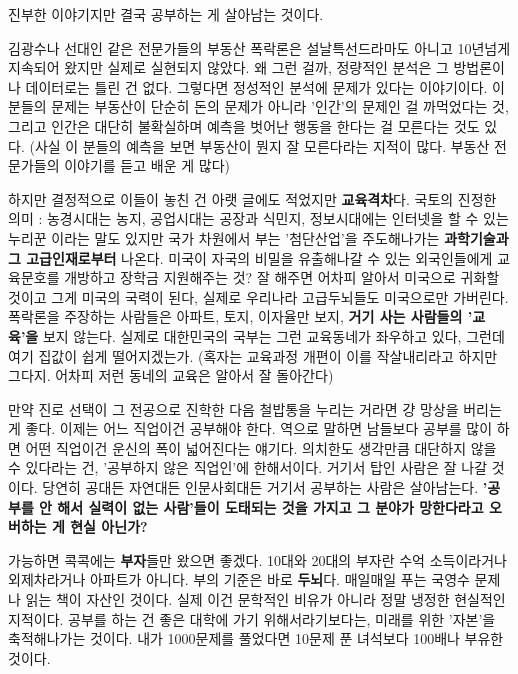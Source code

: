 진부한 이야기지만 결국 공부하는 게 살아남는 것이다.
\vspace{5mm}

김광수나 선대인 같은 전문가들의 부동산 폭락론은 설날특선드라마도 아니고 10년넘게 지속되어 왔지만 실제로 실현되지 않았다.
왜 그런 걸까, 정량적인 분석은 그 방법론이나 데이터로는 틀린 건 없다.
그렇다면 정성적인 분석에 문제가 있다는 이야기이다.
이 분들의 문제는 부동산이 단순히 돈의 문제가 아니라
'인간'의 문제인 걸 까먹었다는 것,
그리고 인간은 대단히 불확실하며 예측을 벗어난 행동을 한다는 걸 모른다는 것도 있다.
(사실 이 분들의 예측을 보면 부동산이 뭔지 잘 모른다라는 지적이 많다. 부동산 전문가들의 이야기를 듣고 배운 게 많다)
\vspace{5mm}

하지만 결정적으로 이들이 놓친 건 아랫 글에도 적었지만 \textbf{교육격차}다.
국토의 진정한 의미 : 농경시대는 농지, 공업시대는 공장과 식민지, 정보시대에는 인터넷을 할 수 있는 누리꾼 이라는 말도 있지만
국가 차원에서 부는 '첨단산업'을 주도해나가는 \textbf{과학기술과 그 고급인재로부터} 나온다.
미국이 자국의 비밀을 유출해나갈 수 있는 외국인들에게 교육문호를 개방하고 장학금 지원해주는 것?
잘 해주면 어차피 알아서 미국으로 귀화할 것이고 그게 미국의 국력이 된다, 실제로 우리나라 고급두뇌들도 미국으로만 가버린다.
폭락론을 주장하는 사람들은 아파트, 토지, 이자율만 보지, \textbf{거기 사는 사람들의 '교육'을} 보지 않는다.
실제로 대한민국의 국부는 그런 교육동네가 좌우하고 있다, 그런데 여기 집값이 쉽게 떨어지겠는가.
(혹자는 교육과정 개편이 이를 작살내리라고 하지만 그다지. 어차피 저런 동네의 교육은 알아서 잘 돌아간다)
\vspace{5mm}

만약 진로 선택이 그 전공으로 진학한 다음 철밥통을 누리는 거라면 걍 망상을 버리는 게 좋다.
이제는 어느 직업이건 공부해야 한다.
역으로 말하면 남들보다 공부를 많이 하면 어떤 직업이건 운신의 폭이 넓어진다는 얘기다.
의치한도 생각만큼 대단하지 않을 수 있다라는 건, '공부하지 않은 직업인'에 한해서이다. 거기서 탑인 사람은 잘 나갈 것이다.
당연히 공대든 자연대든 인문사회대든 거기서 공부하는 사람은 살아남는다.
\textbf{'공부를 안 해서 실력이 없는 사람'들이 도태되는 것을 가지고 그 분야가 망한다라고 오버하는 게 현실 아닌가?}
\vspace{5mm}

가능하면 콕콕에는 \textbf{부자}들만 왔으면 좋겠다.
10대와 20대의 부자란 수억 소득이라거나 외제차라거나 아파트가 아니다.
부의 기준은 바로 \textbf{두뇌}다.
매일매일 푸는 국영수 문제나 읽는 책이 자산인 것이다.
실제 이건 문학적인 비유가 아니라 정말 냉정한 현실적인 지적이다.
공부를 하는 건 좋은 대학에 가기 위해서라기보다는, 미래를 위한 '자본'을 축적해나가는 것이다.
내가 1000문제를 풀었다면 10문제 푼 녀석보다 100배나 부유한 것이다.
\vspace{5mm}

